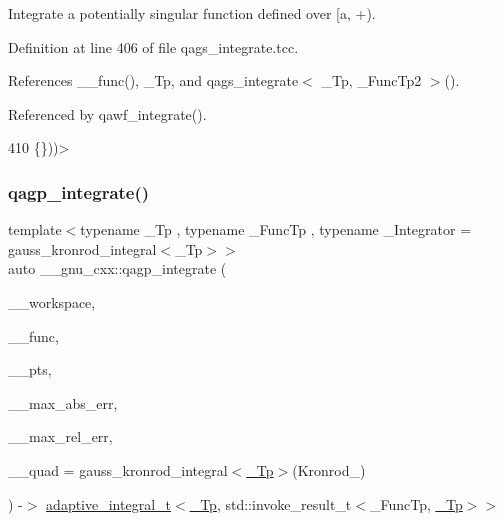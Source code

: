 Integrate a potentially singular function defined over \mbox{[}a, +). 

Definition at line 406 of file qags\+\_\+integrate.\+tcc.



References \+\_\+\+\_\+func(), \+\_\+\+Tp, and qags\+\_\+integrate$<$ \+\_\+\+Tp, \+\_\+\+Func\+Tp2 $>$().



Referenced by qawf\+\_\+integrate().


\begin{DoxyCode}
410                                                                                       \{\}))>
\end{DoxyCode}
\mbox{\label{namespace____gnu__cxx_adf59cfc2db130a9f92d68887e71bbd5f}} 
\subsubsection{\texorpdfstring{qagp\+\_\+integrate()}{qagp\_integrate()}}
{\footnotesize\ttfamily template$<$typename \+\_\+\+Tp , typename \+\_\+\+Func\+Tp , typename \+\_\+\+Integrator  = gauss\+\_\+kronrod\+\_\+integral$<$\+\_\+\+Tp$>$$>$ \\
auto \+\_\+\+\_\+gnu\+\_\+cxx\+::qagp\+\_\+integrate (\begin{DoxyParamCaption}\item[{\hyperlink{class____gnu__cxx_1_1integration__workspace}{integration\+\_\+workspace}$<$ \hyperlink{namespace____gnu__cxx_a3b19a9c800ca194374ef9172290f7d79}{\+\_\+\+Tp}, std\+::invoke\+\_\+result\+\_\+t$<$ \+\_\+\+Func\+Tp, \hyperlink{namespace____gnu__cxx_a3b19a9c800ca194374ef9172290f7d79}{\+\_\+\+Tp} $>$$>$ \&}]{\+\_\+\+\_\+workspace,  }\item[{\+\_\+\+Func\+Tp}]{\+\_\+\+\_\+func,  }\item[{std\+::vector$<$ \hyperlink{namespace____gnu__cxx_a3b19a9c800ca194374ef9172290f7d79}{\+\_\+\+Tp} $>$}]{\+\_\+\+\_\+pts,  }\item[{\hyperlink{namespace____gnu__cxx_a3b19a9c800ca194374ef9172290f7d79}{\+\_\+\+Tp}}]{\+\_\+\+\_\+max\+\_\+abs\+\_\+err,  }\item[{\hyperlink{namespace____gnu__cxx_a3b19a9c800ca194374ef9172290f7d79}{\+\_\+\+Tp}}]{\+\_\+\+\_\+max\+\_\+rel\+\_\+err,  }\item[{\+\_\+\+Integrator}]{\+\_\+\+\_\+quad = {\ttfamily gauss\+\_\+kronrod\+\_\+integral$<$\hyperlink{namespace____gnu__cxx_a3b19a9c800ca194374ef9172290f7d79}{\+\_\+\+Tp}$>$(Kronrod\+\_)} }\end{DoxyParamCaption}) -\/$>$ \hyperlink{struct____gnu__cxx_1_1adaptive__integral__t}{adaptive\+\_\+integral\+\_\+t}$<$\hyperlink{namespace____gnu__cxx_a3b19a9c800ca194374ef9172290f7d79}{\+\_\+\+Tp}, std\+::invoke\+\_\+result\+\_\+t$<$\+\_\+\+Func\+Tp, \hyperlink{namespace____gnu__cxx_a3b19a9c800ca194374ef9172290f7d79}{\+\_\+\+Tp}$>$$>$
    }

